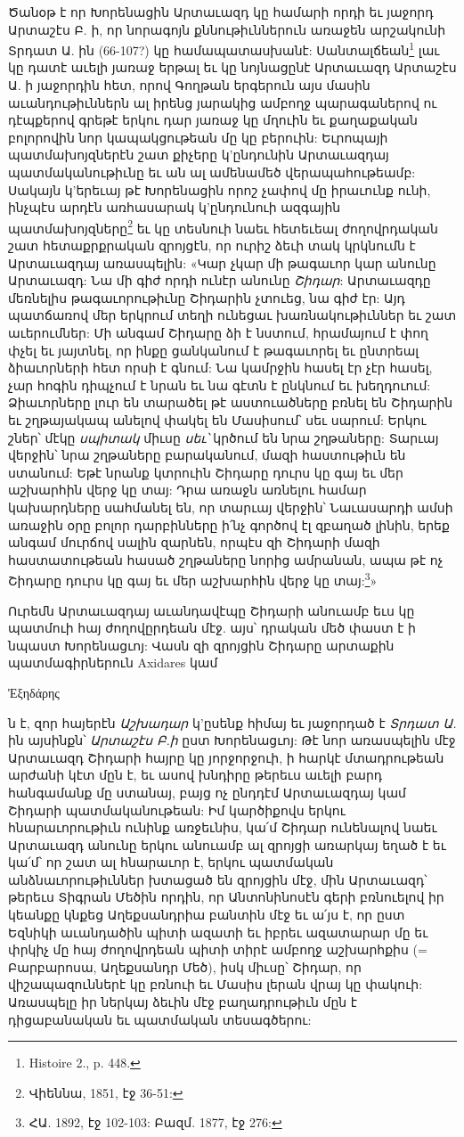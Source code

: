 \documentclass{article}
\begin{document}
{Ծանօթ է որ Խորենացին Արտաւազդ կը համարի որդի եւ յաջորդ Արտաշէս Բ. ի, որ նորագոյն քննութիւններուն առաջեն արշակունի Տրդատ Ա. ին (66-107?) կը համապատասխանէ: Սանտալճեան\footnote{Histoire 2., p. 448.} լաւ կը դատէ աւելի յառաջ երթալ եւ կը նոյնացընէ Արտաւազդ Արտաշէս Ա. ի յաջորդին հետ, որով Գողթան երգերուն այս մասին աւանդութիւններն ալ իրենց յարակից ամբողջ պարագաներով ու դէպքերով գրեթէ երկու դար յառաջ կը մղուին եւ քաղաքական բոլորովին նոր կապակցութեան մը կը բերուին: Եւրոպայի պատմախոյզներէն շատ քիչերը կ'ընդունին Արտաւազդայ պատմականութիւնը եւ ան ալ ամենամեծ վերապահութեամբ: Սակայն կ'երեւայ թէ Խորենացին որոշ չափով մը իրաւունք ունի, ինչպէս արդէն առհասարակ կ'ընդունուի ազգային պատմախոյզները\footnote{Վիեննա, 1851, էջ 36-51:} եւ կը տեսնուի նաեւ հետեւեալ ժողովրդական շատ հետաքրքրական զրոյցէն, որ ուրիշ ձեւի տակ կրկնումն է Արտաւազդայ առասպելին: «Կար չկար մի թագաւոր կար անունը Արտաւազդ: Նա մի գիժ որդի ունէր անունը \emph{Շիդար}: Արտաւազդը մեռնելիս թագաւորութիւնը Շիդարին չտուեց, նա գիժ էր: Այդ պատճառով մեր երկրում տեղի ունեցաւ խառնակութիւններ եւ շատ աւերումներ: Մի անգամ Շիդարը ձի է նստում, հրամայում է փող փչել եւ յայտնել, որ ինքը ցանկանում է թագաւորել եւ ընտրեալ ձիաւորների հետ որսի է գնում: Նա կամրջին հասել էր չէր հասել, չար հոգին դիպչում է նրան եւ նա գէտն է ընկնում եւ խեղդուում: Ձիաւորները լուր են տարածել թէ աստուածները բռնել են Շիդարին եւ շղթայակապ անելով փակել են Մասիսում՝ սեւ սարում: Երկու շներ՝ մէկը \emph{սպիտակ} միւսը \emph{սեւ՝} կրծում են նրա շղթաները: Տարւայ վերջին՝ նրա շղթաները բարականում, մազի հաստութիւն են ստանում: Եթէ նրանք կտրուին Շիդարը դուրս կը գայ եւ մեր աշխարհին վերջ կը տայ: Դրա առաջն առնելու համար կախարդները սահմանել են, որ տարւայ վերջին՝ Նաւասարդի ամսի առաջին օրը բոլոր դարբինները ի՛նչ գործով էլ զբաղած լինին, երեք անգամ մուրճով սալին զարնեն, որպէս զի Շիդարի մազի հաստատութեան հասած շղթաները նորից ամրանան, ապա թէ ոչ Շիդարը դուրս կը գայ եւ մեր աշխարհին վերջ կը տայ:\footnote{ՀԱ. 1892, էջ 102-103: Բազմ. 1877, էջ 276:}»

Ուրեմն Արտաւազդայ աւանդավէպը Շիդարի անուամբ եւս կը պատմուի հայ ժողովըրդեան մէջ. այս՝ դրական մեծ փաստ է ի նպաստ Խորենացւոյ: Վասն զի զրոյցին Շիդարը արտաքին պատմագիրներուն Axidares կամ \begin{greek}Ἐξηδάρης\end{greek}ն է, զոր հայերէն \emph{Աշխադար} կ'ըսենք հիմայ եւ յաջորդած է \emph{Տրդատ Ա.} ին այսինքն՝ \emph{Արտաշէս Բ.ի} ըստ Խորենացւոյ: Թէ նոր առասպելին մէջ Արտաւազդ Շիդարի հայրը կը յորջորջուի, ի հարկէ մտադրութեան արժանի կէտ մըն է, եւ ասով խնդիրը թերեւս աւելի բարդ հանգամանք մը ստանայ, բայց ոչ ընդդէմ Արտաւազդայ կամ Շիդարի պատմականութեան: Իմ կարծիքովս երկու հնարաւորութիւն ունինք առջեւնիս, կա՛մ Շիդար ունենալով նաեւ Արտաւազդ անունը երկու անուամբ ալ զրոյցի առարկայ եղած է եւ կա՛մ՝ որ շատ ալ հնարաւոր է, երկու պատմական անձնաւորութիւններ խտացած են զրոյցին մէջ, մին Արտաւազդ՝ թերեւս Տիգրան Մեծին որդին, որ Անտոնինոսէն գերի բռնուելով իր կեանքը կնքեց Աղեքսանդրիա բանտին մէջ եւ ա՛յս է, որ ըստ Եզնիկի աւանդածին պիտի ազատի եւ իբրեւ ազատարար մը եւ փրկիչ մը հայ ժողովրդեան պիտի տիրէ ամբողջ աշխարհքիս (= Բարբարոսա, Աղեքսանդր Մեծ), իսկ միւսը՝ Շիդար, որ վիշապազուններէ կը բռնուի եւ Մասիս լերան վրայ կը փակուի: Առասպելը իր ներկայ ձեւին մէջ բաղադրութիւն մըն է դիցաբանական եւ պատմական տեսագծերու:

}
\end{document}
